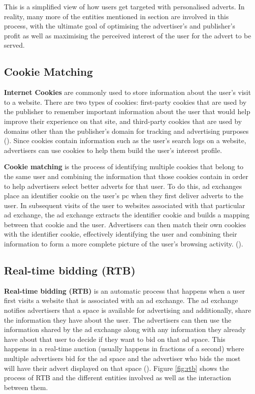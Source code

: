 \documentclass{l4proj}
\begin{document}
This is a simplified view of how users get targeted with personalised adverts. In reality, many more of the entities mentioned in section  are involved in this process, with the ultimate goal of optimising the advertiser's and publisher's profit as well as maximising the perceived interest of the user for the advert to be served.

\subsection{Cookie Matching}
\textbf{Internet Cookies} are commonly used to store information about the user's visit to a website. There are two types of cookies: first-party cookies that are used by the publisher to remember important information about the user that would help improve their experience on that site, and third-party cookies that are used by domains other than the publisher's domain for tracking and advertising purposes (\cite{Estrada-Jimenez2017}). Since cookies contain information such as the user's search logs on a website, advertisers can use cookies to help them build the user's interest profile. 

\textbf{Cookie matching} is the process of identifying multiple cookies that belong to the same user and combining the information that those cookies contain in order to help advertisers select better adverts for that user. To do this, ad exchanges place an identifier cookie on the user's pc when they first deliver adverts to the user. In subsequent visits of the user to websites associated with that particular ad exchange, the ad exchange extracts the identifier cookie and builds a mapping between that cookie and the user. Advertisers can then match their own cookies with the identifier cookie, effectively identifying the user and combining their information to form a more complete picture of the user's browsing activity. (\cite{cm}).

\subsection{Real-time bidding (RTB)}
\textbf{Real-time bidding (RTB)} is an automatic process that happens when a user first visits a website that is associated with an ad exchange. The ad exchange notifies advertisers that a space is available for advertising and additionally, share the information they have about the user. The advertisers can then use the information shared by the ad exchange along with any information they already have about that user to decide if they want to bid on that ad space. This happens in a real-time auction (usually happens in fractions of a second) where multiple advertisers bid for the ad space and the advertiser who bids the most will have their advert displayed on that space (\cite{RTB}). Figure \ref{fig:rtb} shows the process of RTB and the different entities involved as well as the interaction between them.
\end{document}
